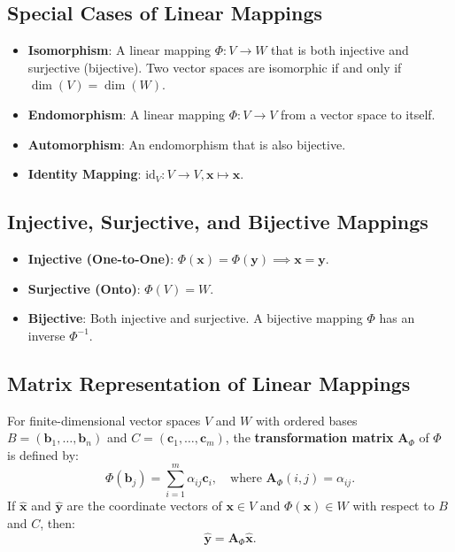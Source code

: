 \subsection{Special Cases of Linear Mappings}
\begin{itemize}
    \item \textbf{Isomorphism}: A linear mapping \(\Phi: V \to W\) that is both injective and surjective (bijective). Two vector spaces are isomorphic if and only if \(\dim(V) = \dim(W)\).

    \item \textbf{Endomorphism}: A linear mapping \(\Phi: V \to V\) from a vector space to itself.

    \item \textbf{Automorphism}: An endomorphism that is also bijective.

    \item \textbf{Identity Mapping}: \(\text{id}_V: V \to V, \mathbf{x} \mapsto \mathbf{x}\).
\end{itemize}

\subsection{Injective, Surjective, and Bijective Mappings}
\begin{itemize}
    \item \textbf{Injective (One-to-One)}: \(\Phi(\mathbf{x}) = \Phi(\mathbf{y}) \implies \mathbf{x} = \mathbf{y}\).
    \item \textbf{Surjective (Onto)}: \(\Phi(V) = W\).
    \item \textbf{Bijective}: Both injective and surjective. A bijective mapping \(\Phi\) has an inverse \(\Phi^{-1}\).
\end{itemize}

\subsection{Matrix Representation of Linear Mappings}
For finite-dimensional vector spaces \(V\) and \(W\) with ordered bases \(B = (\mathbf{b}_1, \ldots, \mathbf{b}_n)\) and \(C = (\mathbf{c}_1, \ldots, \mathbf{c}_m)\), the \textbf{transformation matrix} \(\mathbf{A}_\Phi\) of \(\Phi\) is defined by:
\[
\Phi(\mathbf{b}_j) = \sum_{i=1}^m \alpha_{ij} \mathbf{c}_i, \quad \text{where } \mathbf{A}_\Phi(i,j) = \alpha_{ij}.
\]
If \(\hat{\mathbf{x}}\) and \(\hat{\mathbf{y}}\) are the coordinate vectors of \(\mathbf{x} \in V\) and \(\Phi(\mathbf{x}) \in W\) with respect to \(B\) and \(C\), then:
\[
\hat{\mathbf{y}} = \mathbf{A}_\Phi \hat{\mathbf{x}}.
\]


